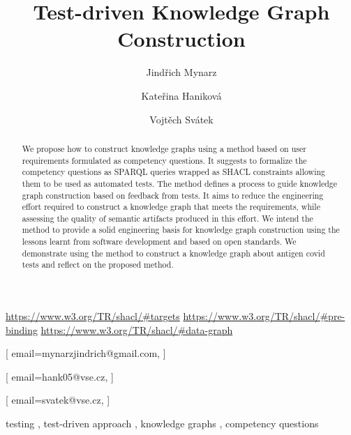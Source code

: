 \documentclass[
]{ceurart}
\begin{document}
\urldef\urlshacltargets\url{https://www.w3.org/TR/shacl/#targets}
\urldef\urlshaclprebinding\url{https://www.w3.org/TR/shacl/#pre-binding}
\urldef\urlschaclgraphdata\url{https://www.w3.org/TR/shacl/#data-graph}


\title{Test-driven Knowledge Graph Construction}


\author[1]{Jindřich Mynarz}[%
email=mynarzjindrich@gmail.com,
]
\address[1]{Department of Information and Knowledge Engineering, Prague University of Economics and Business \\ Nám. W. Churchilla 4, 130 67, Praha 3, Czech Republic}

\author[1]{Kateřina Haniková}[%
email=hank05@vse.cz,
]

\author[1]{Vojtěch Svátek}[%
email=svatek@vse.cz,
]

\begin{abstract}
  We propose how to construct knowledge graphs using a method based on user requirements formulated as competency questions. It suggests to formalize the competency questions as SPARQL queries wrapped as SHACL constraints allowing them to be used as automated tests. The method defines a process to guide knowledge graph construction based on feedback from tests. It aims to reduce the engineering effort required to construct a knowledge graph that meets the requirements, while assessing the quality of semantic artifacts produced in this effort. We intend the method to provide a solid engineering basis for knowledge graph construction using the lessons learnt from software development and based on open standards. We demonstrate using the method to construct a knowledge graph about antigen covid tests and reflect on the proposed method.
\end{abstract}

\begin{keywords}
  testing \sep
  test-driven approach \sep
  knowledge graphs \sep
  competency questions
\end{keywords}
\end{document}
